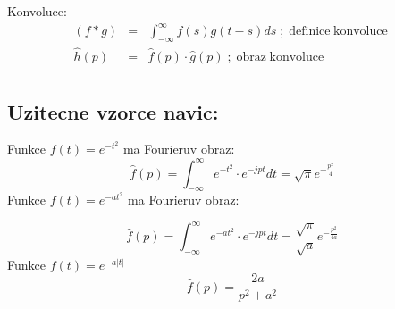Konvoluce:
\begin{equation}
\label{eq:konvoluce}
\begin{array}{rcl}
(f*g) & =& \int_{-\infty}^{\infty} f(s)g(t-s)ds \; ; \operatorname{definice \; konvoluce}\\
\hat{h}(p)&  = & \hat{f}(p)\cdot \hat{g}(p) \; ; \operatorname{obraz \; konvoluce} \\
\end{array}
\end{equation}


\subsection*{Uzitecne vzorce navic:}

Funkce $f(t) = e^{-t^2}$ ma Fourieruv obraz:
\begin{equation}
\label{eq:ena2}
\hat{f}(p)=\int_{-\infty}^\infty e^{{-t}^2}\cdot e^{-jpt}dt = \sqrt{\pi}e^{-\frac{p^2}{4}}
\end{equation}
Funkce $f(t) = e^{-at^2}$ ma Fourieruv obraz:

\begin{equation}
\label{eq:aena2}
\hat{f}(p)=\int_{-\infty}^\infty e^{-at^2}\cdot e^{-jpt}dt = \frac{\sqrt{\pi}}{\sqrt{a}}e^{-\frac{p^2}{4a}}
\end{equation}
Funkce $f(t) = e^{-a|t|}$
\begin{equation}
\label{eq:enaabs}
\hat{f}(p)=\frac{2a}{p^2+a^2}
\end{equation}